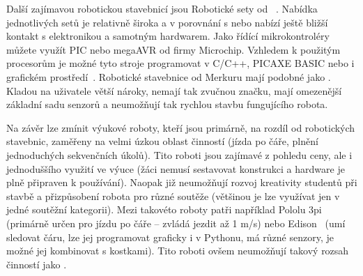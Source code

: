 
Další zajímavou robotickou stavebnicí jsou Robotické sety od ~\cite{merkur_roboticsSetsEshop}. 
Nabídka jednotlivých setů je relativně široka a v porovnání s \legoM{ }nebo \fischerT{ }nabízí ještě bližší kontakt s elektronikou a samotným hardwarem. 
Jako řídící mikrokontroléry můžete využít PIC nebo megaAVR od firmy Microchip. 
Vzhledem k použitým procesorům je možné tyto stroje programovat v C/C++, PICAXE BASIC nebo i grafickém prostředí~\cite{picaxeCz_BlocklyForPICAXE}. 
Robotické stavebnice od Merkuru mají podobné  jako \fischerT. 
Kladou na uživatele větší nároky, nemají tak zvučnou značku, mají omezenější základní sadu senzorů a neumožňují tak rychlou stavbu fungujícího robota.

Na závěr lze zmínit výukové roboty, kteří jsou primárně, na rozdíl od robotických stavebnic, zaměřeny na velmi úzkou oblast činností (jízda po čáře, plnění jednoduchých sekvenčních úkolů). 
Tito roboti jsou zajímavé z pohledu ceny, ale i jednoduššího využití ve výuce (žáci nemusí sestavovat konstrukci a hardware je plně připraven k používání). 
Naopak již neumožňují rozvoj kreativity studentů při stavbě a přizpůsobení robota pro různé soutěže (většinou je lze využívat jen v jedné soutěžní kategorii).  
Mezi takovéto roboty patři například Pololu 3pi~\cite{robotPololu3pi} (primárně určen pro jízdu po čáře -- zvládá jezdit až 1 m/s) nebo Edison~\cite{robotEdison} (umí sledovat čáru, lze jej programovat graficky i v Pythonu, má různé senzory, je možné jej kombinovat s \lego{ }kostkami). 
Tito roboti ovšem neumožňují takový rozsah činností jako \legoM.


